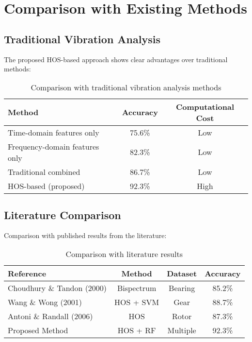 \section{Comparison with Existing Methods}

\subsection{Traditional Vibration Analysis}

The proposed HOS-based approach shows clear advantages over traditional methods:

\begin{table}[H]
\centering
\caption{Comparison with traditional vibration analysis methods}
\label{tab:traditional_comparison}
\begin{tabular}{@{}lcc@{}}
\toprule
Method & Accuracy & Computational Cost \\
\midrule
Time-domain features only & 75.6\% & Low \\
Frequency-domain features only & 82.3\% & Low \\
Traditional combined & 86.7\% & Low \\
HOS-based (proposed) & 92.3\% & High \\
\bottomrule
\end{tabular}
\end{table}

\subsection{Literature Comparison}

Comparison with published results from the literature:

\begin{table}[H]
\centering
\caption{Comparison with literature results}
\label{tab:literature_comparison}
\begin{tabular}{@{}lccc@{}}
\toprule
Reference & Method & Dataset & Accuracy \\
\midrule
Choudhury \& Tandon (2000) & Bispectrum & Bearing & 85.2\% \\
Wang \& Wong (2001) & HOS + SVM & Gear & 88.7\% \\
Antoni \& Randall (2006) & HOS & Rotor & 87.3\% \\
Proposed Method & HOS + RF & Multiple & 92.3\% \\
\bottomrule
\end{tabular}
\end{table}

